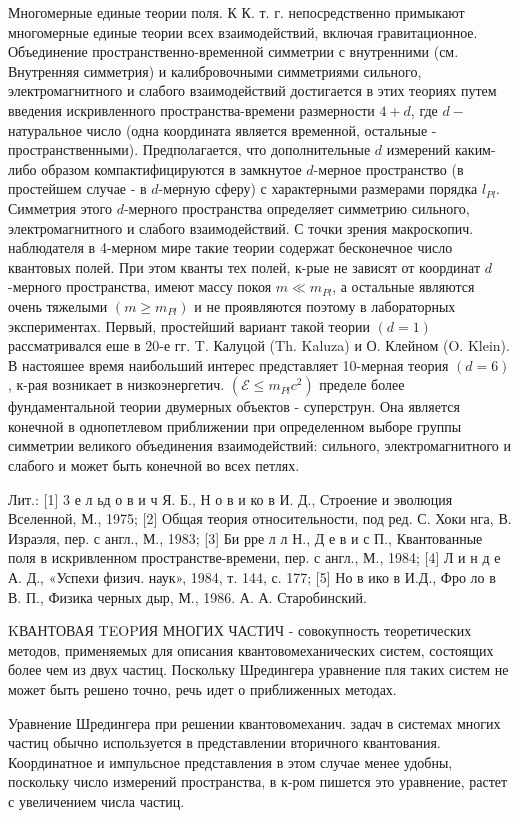 \documentclass[10pt]{article}
\begin{document}
Многомерные единые теории поля. К К. т. г. непосредственно примыкают многомерные единые теории всех взаимодействий, включая гравитационное. Объединение пространственно-временной симметрии с внутренними (см. Внутренняя симметрия) и калибровочными симметриями сильного, электромагнитного и слабого взаимодействий достигается в этих теориях путем введения искривленного пространства-времени размерности $4+d$, где $d-$ натуральное число (одна координата является временной, остальные - пространственными). Предполагается, что дополнительные $d$ измерений каким-либо образом компактифицируются в замкнутое $d$-мерное пространство (в простейшем случае - в $d$-мерную сферу) с характерными размерами порядка $l_{P l}$. Симметрия этого $d$-мерного пространства определяет симметрию сильного, электромагнитного и слабого взаимодействий. С точки зрения макроскопич. наблюдателя в 4-мерном мире такие теории содержат бесконечное число квантовых полей. При этом кванты тех полей, к-рые не зависят от координат $d$-мерного пространства, имеют массу покоя $m \ll m_{P l}$, а остальные являются очень тяжелыми $\left(m \geqslant m_{P l}\right)$ и не проявляются поэтому в лабораторных экспериментах. Первый, простейший вариант такой теории $(d=1)$ рассматривался еше в 20-е гг. T. Калуцой (Th. Kaluza) и О. Клейном (O. Klein). В настояшее время наибольший интерес представляет 10-мерная теория $(d=6)$, к-рая возникает в низкоэнергетич. $\left(\mathscr{E} \leqslant m_{P l} c^{2}\right)$ пределе более фундаментальной теории двумерных объектов - суперструн. Она является конечной в однопетлевом приближении при определенном выборе группы симметрии великого объединения взаимодействий: сильного, электромагнитного и слабого и может быть конечной во всех петлях.



Лит.: [1] 3 е л ьд о в и ч Я. Б., Н о в и ко в И. Д., Строение и эволюция Вселенной, М., 1975; [2] Общая теория относительности, под ред. С. Хоки нга, В. Израэля, пер. с англ., М., 1983; [3] Би рре л л Н., Д е в и с П., Квантованные поля в искривленном пространстве-времени, пер. с англ., М., 1984; [4] Л и н д е А. Д., «Успехи физич. наук», 1984, т. 144, с. 177; [5] Но в ико в И.Д., Фро ло в В. П., Физика черных дыр, М., 1986. А. А. Старобинский.



KВАНТОВАЯ TEOPИЯ МНОГИХ ЧАСТИЧ - совокупность теоретических методов, применяемых для описания квантовомеханических систем, состоящих более чем из двух частиц. Поскольку Шредингера уравнение пля таких систем не может быть решено точно, речь идет о приближенных методах.



Уравнение Шредингера при решении квантовомеханич. задач в системах многих частиц обычно используется в представлении вторичного квантования. Координатное и импульсное представления в этом случае менее удобны, поскольку число измерений пространства, в к-ром пишется это уравнение, растет с увеличением числа частиц.
\end{document}
